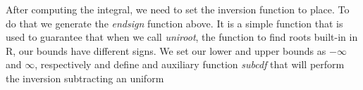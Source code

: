 \documentclass[12pt,twoside]{reedthesis}
\theoremstyle{definition}
\theoremstyle{definition}
\theoremstyle{remark}
\begin{document}
  \footnotesize
  \begin{Shaded}
  \begin{Highlighting}[]
  \StringTok{ }
      
  \StringTok{ }
        \NormalTok{(}\OperatorTok{*}\StringTok{ }\NormalTok{(}\OperatorTok{-}\OperatorTok{*}\StringTok{ }\OperatorTok{*}\StringTok{ }\OperatorTok{/}
  \NormalTok{    \}}
  \NormalTok{  \}}
    
  \StringTok{ }
  \StringTok{ } \OperatorTok{-}\StringTok{ }\OperatorTok{/}\OperatorTok{*}\StringTok{ }\OperatorTok{::}\NormalTok{(} \NormalTok{, } \NormalTok{,}
                                   \NormalTok{, } \NormalTok{)}\OperatorTok{$}
  \NormalTok{  \}}
    
    
  \StringTok{ } \NormalTok{) \{}
  \StringTok{ }
      \OperatorTok{*}\StringTok{ }\OperatorTok{<}\StringTok{ }\StringTok{ } \OperatorTok{*}\StringTok{ }
  \NormalTok{  \}}
  \end{Highlighting}
  \end{Shaded}
  After computing the integral, we need to set the inversion function to
  place. To do that we generate the \emph{endsign} function above. It is a
  simple function that is used to guarantee that when we call
  \emph{uniroot}, the function to find roots built-in in R, our bounds
  have different signs. We set our lower and upper bounds as \(- \infty\)
  and \(\infty\), respectively and define and auxiliary function
  \emph{subcdf} that will perform the inversion subtracting an uniform
\end{document}
